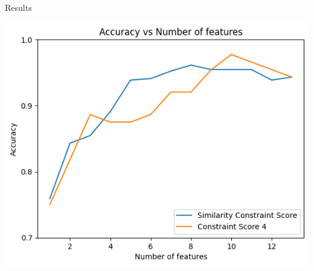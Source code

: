 \documentclass{beamer}
\begin{document}
\begin{frame}{Results}

    \begin{center}
    \includegraphics[height=0.8\textheight]{../Images/simCS.png}
    \end{center}
\end{frame}


\printbibliography
\end{document}
